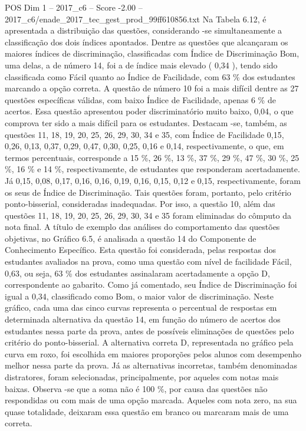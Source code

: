 \begin{textsample}{POS Dim 1 – 2017\_c6 – Score -2.00 – 2017\_c6/enade\_2017\_tec\_gest\_prod\_99ff610856.txt}
Na Tabela 6.12, é apresentada a distribuição das questões, considerando -se simultaneamente a classificação dos dois índices apontados.
Dentre as questões que alcançaram os maiores índices de discriminação, classificadas com Índice de Discriminação Bom, uma delas, a de número 14, foi a de índice mais elevado ( 0,34 ), tendo sido classificada como Fácil quanto ao Índice de Facilidade, com 63 \% dos estudantes marcando a opção correta.
A questão de número 10 foi a mais difícil dentre as 27 questões específicas válidas, com baixo Índice de Facilidade, apenas 6 \% de acertos.
Essa questão apresentou poder discriminatório muito baixo, 0,04, o que comprova ter sido a mais difícil para os estudantes.
Destacam -se, também, as questões 11, 18, 19, 20, 25, 26, 29, 30, 34 e 35, com Índice de Facilidade 0,15, 0,26, 0,13, 0,37, 0,29, 0,47, 0,30, 0,25, 0,16 e 0,14, respectivamente, o que, em termos percentuais, corresponde a 15 \%, 26 \%, 13 \%, 37 \%, 29 \%, 47 \%, 30 \%, 25 \%, 16 \% e 14 \%, respectivamente, de estudantes que responderam acertadamente.
Já 0,15, 0,08, 0,17, 0,16, 0,16, 0,19, 0,16, 0,15, 0,12 e 0,15, respectivamente, foram os seus de Índice de Discriminação.
Tais questões foram, portanto, pelo critério ponto-bisserial, consideradas inadequadas.
Por isso, a questão 10, além das questões 11, 18, 19, 20, 25, 26, 29, 30, 34 e 35 foram eliminadas do cômputo da nota final.
A título de exemplo das análises do comportamento das questões objetivas, no Gráfico 6.5, é analisada a questão 14 do Componente de Conhecimento Específico.
Esta questão foi considerada, pelas respostas dos estudantes avaliados na prova, como uma questão com nível de facilidade Fácil, 0,63, ou seja, 63 \% dos estudantes assinalaram acertadamente a opção D, correspondente ao gabarito.
Como já comentado, seu Índice de Discriminação foi igual a 0,34, classificado como Bom, o maior valor de discriminação.
Neste gráfico, cada uma das cinco curvas representa o percentual de respostas em determinada alternativa da questão 14, em função do número de acertos dos estudantes nessa parte da prova, antes de possíveis eliminações de questões pelo critério do ponto-bisserial.
A alternativa correta D, representada no gráfico pela curva em roxo, foi escolhida em maiores proporções pelos alunos com desempenho melhor nessa parte da prova.
Já as alternativas incorretas, também denominadas distratores, foram selecionadas, principalmente, por aqueles com notas mais baixas.
Observa -se que a soma não é 100 \%, por causa das questões não respondidas ou com mais de uma opção marcada.
Aqueles com nota zero, na sua quase totalidade, deixaram essa questão em branco ou marcaram mais de uma correta.

\end{textsample}
